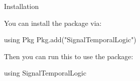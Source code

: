 \begin{frame}[fragile]{Installation} \pause

You can install the  package via:

\begin{algorithmblock}
\begin{juliaverbatim}
using Pkg
Pkg.add("SignalTemporalLogic")
\end{juliaverbatim}
\end{algorithmblock}

\vfill \pause

Then you can run this to use the package:

\begin{algorithmblock}
\begin{juliaverbatim}
using SignalTemporalLogic
\end{juliaverbatim}
\end{algorithmblock}
    
\end{frame}